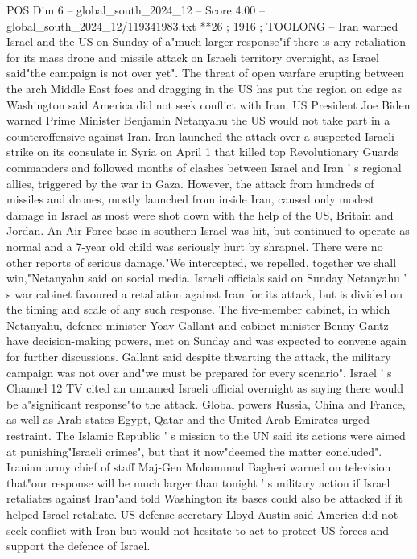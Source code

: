 \begin{textsample}{POS Dim 6 – global\_south\_2024\_12 – Score 4.00 – global\_south\_2024\_12/119341983.txt}  \label{ex:f6_pos_430}
**26 ; 1916 ; TOOLONG -- Iran warned Israel and the US on Sunday of a"much larger response"if there is any retaliation for its mass drone and missile attack on Israeli territory overnight, as Israel said"the campaign is not over yet".
The threat of open warfare erupting between the arch Middle East foes and dragging in the US has put the region on edge as Washington said America did not seek conflict with Iran.
US President Joe Biden warned Prime Minister Benjamin Netanyahu the US would not take part in a counteroffensive against Iran.
Iran launched the attack over a suspected Israeli strike on its consulate in Syria on April 1 that killed top Revolutionary Guards commanders and followed months of clashes between Israel and Iran ' s regional allies, triggered by the war in Gaza.
However, the attack from hundreds of missiles and drones, mostly launched from inside Iran, caused only modest damage in Israel as most were shot down with the help of the US, Britain and Jordan.
An Air Force base in southern Israel was hit, but continued to operate as normal and a 7-year old child was seriously hurt by shrapnel.
There were no other reports of serious damage."We intercepted, we repelled, together we shall win,"Netanyahu said on social media.
Israeli officials said on Sunday Netanyahu ' s war cabinet favoured a retaliation against Iran for its attack, but is divided on the timing and scale of any such response.
The five-member cabinet, in which Netanyahu, defence minister Yoav Gallant and cabinet minister Benny Gantz have decision-making powers, met on Sunday and was expected to convene again for further discussions.
Gallant said despite thwarting the attack, the military campaign was not over and"we must be prepared for every scenario".
Israel ' s Channel 12 TV cited an unnamed Israeli official overnight as saying there would be a"significant response"to the attack.
Global powers Russia, China and France, as well as Arab states Egypt, Qatar and the United Arab Emirates urged restraint.
The Islamic Republic ' s mission to the UN said its actions were aimed at punishing"Israeli crimes", but that it now"deemed the matter concluded".
Iranian army chief of staff Maj-Gen Mohammad Bagheri warned on television that"our response will be much larger than tonight ' s military action if Israel retaliates against Iran"and told Washington its bases could also be attacked if it helped Israel retaliate.
US defense secretary Lloyd Austin said America did not seek conflict with Iran but would not hesitate to act to protect US forces and support the defence of Israel.

\end{textsample}
